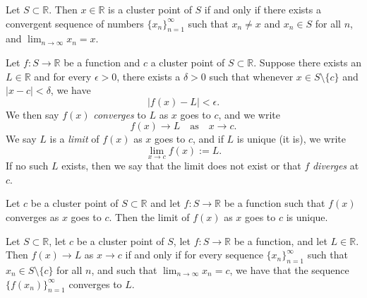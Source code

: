 \documentclass[../main.tex]{subfiles}
\begin{document}
    
    \begin{proposition}
        Let $S \subset \mathbb{R}$. Then $x \in \mathbb{R}$ is a cluster point of $S$ if and only if there exists a convergent sequence of numbers $\{x_n\}_{n=1}^{\infty}$ such that $x_n \neq x$ and $x_n \in S$ for all $n$, and 
        \(
        \lim_{n\to\infty} x_n = x.
        \)
    \end{proposition}
    
    
    
    
    \begin{definition}
        Let $f : S \to \mathbb{R}$ be a function and $c$ a cluster point of $S \subset \mathbb{R}$. Suppose there exists an $L \in \mathbb{R}$ and for every $\epsilon > 0$, there exists a $\delta > 0$ such that whenever $x \in S \setminus \{c\}$ and $|x - c| < \delta$, we have
        \[
        |f(x) - L| < \epsilon.
        \]
        We then say $f(x)$ \textit{converges} to $L$ as $x$ goes to $c$, and we write
        \[
        f(x) \to L \quad \text{as} \quad x \to c.
        \]
        We say $L$ is a \textit{limit} of $f(x)$ as $x$ goes to $c$, and if $L$ is unique (it is), we write
        \[
        \lim_{x\to c} f(x) := L.
        \]
        If no such $L$ exists, then we say that the limit does not exist or that $f$ \textit{diverges} at $c$.
        
    \end{definition}
        
    \begin{proposition}
    Let $c$ be a cluster point of $S \subset \mathbb{R}$ and let $f : S \to \mathbb{R}$ be a function such that $f(x)$ converges as $x$ goes to $c$. Then the limit of $f(x)$ as $x$ goes to $c$ is unique.
    \end{proposition}
        
    
    
    \begin{lemma}
        Let $S \subset \mathbb{R}$, let $c$ be a cluster point of $S$, let $f : S \to \mathbb{R}$ be a function, and let $L \in \mathbb{R}$. Then $f(x) \to L$ as $x \to c$ if and only if for every sequence $\{x_n\}_{n=1}^{\infty}$ such that $x_n \in S \setminus \{c\}$ for all $n$, and such that $\lim_{n\to\infty} x_n = c$, we have that the sequence $\{f(x_n)\}_{n=1}^{\infty}$ converges to $L$.
    \end{lemma}
        
\end{document}
